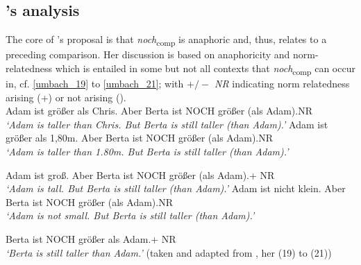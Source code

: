 \documentclass[output=paper,
modfonts
]{langscibook}
\begin{document}
\subsection{\citeauthor{umbach2009a_comp}'s \citeyearpar{umbach2009a_comp} analysis} \label{SubSec_umbach_analysis}

The core of \citeauthor{umbach2009a_comp}'s \citeyearpar{umbach2009a_comp} proposal is that \textit{noch}\textsubscript{comp} is anaphoric and, thus, relates to a preceding comparison. Her discussion is based on anaphoricity and norm-relatedness which is entailed in some but not all contexts that \textit{noch}\textsubscript{comp} can occur in, cf. \ref{umbach_19} to \ref{umbach_21}; with \textit{$+/-$ NR} indicating norm relatedness arising (+) or not arising (\textminus).\\


\ea \label{umbach_19} \ea \small Adam ist größer als Chris. Aber Berta ist NOCH größer (als Adam).\hfill \textminus NR\\ \textit{`Adam is taller than Chris. But Berta is still taller (than Adam).'} \label{umbach_19a}
\ex \small Adam ist größer als 1,80m. Aber Berta ist NOCH größer (als Adam).\hfill \textminus NR\\ \textit{`Adam is taller than 1.80m. But Berta is still taller (than Adam).'} \label{umbach_19b}\\
   \z\z

\ea\label{umbach_20} \ea\small Adam ist groß. Aber Berta ist NOCH größer (als Adam).\hfill + NR\\ \textit{`Adam is tall. But Berta is still taller (than Adam).'} \label{umbach_20a}
\ex\small Adam ist nicht klein. Aber Berta ist NOCH größer (als Adam).\hfill \textminus NR\\ \textit{`Adam is not small. But Berta is still taller (than Adam).'} \label{umbach_20b}\\
\z\z

\ea\small\label{umbach_21} Berta ist NOCH größer als Adam.\hfill + NR\\ \textit{`Berta is still taller than Adam.'} \flushright (taken and adapted from \citealt{umbach2009a_comp}, her (19) to (21))\z
\end{document}
